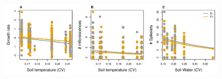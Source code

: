 \documentclass[12pt,english]{article}
\begin{document}
\begin{spacing}{1.9}
\begin{figure}[H]
  \begin{center}
   \includegraphics[width=0.98\linewidth]{Figures/Bestmodels.pdf}
  \caption{}
  \label{fig:gradient}
  \end{center}
\end{figure}

\end{spacing}
\end{document}
